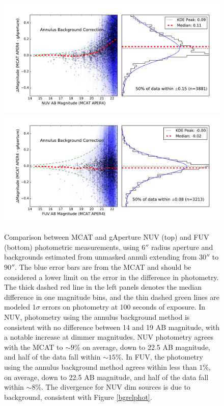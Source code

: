 \documentclass[iop]{emulateapj}
\begin{document}
\begin{figure}[t!]
\includegraphics[scale=0.3]{Fig04a.pdf}\\
\includegraphics[scale=0.3]{Fig04b.pdf}
\caption{Comparison between MCAT and gAperture NUV (top) and FUV (bottom) photometric measurements, using $6''$ radius aperture and backgrounds estimated from unmasked annuli extending from $30''$ to $90''$. The blue error bars are from the MCAT and should be considered a lower limit on the error in the difference in photometry. The thick dashed red line in the left panels denotes the median difference in one magnitude bins, and the thin dashed green lines are modeled 1$\sigma$ errors on photometry at 100 seconds of exposure. In NUV, photometry using the annulus background method is consistent with no difference between 14 and 19 AB magnitude, with a notable increase at dimmer magnitudes. NUV photometry agrees with the MCAT to $\sim 9$\% on average, down to 22.5 AB magnitude, and half of the data fall within $\sim 15$\%. In FUV, the photometry using the annulus background method agrees within less than $1$\%, on average, down to 22.5 AB magnitude, and half of the data fall within $\sim 8$\%. The divergence for NUV dim sources is due to background, consistent with Figure \ref{bgrelphot}.
\label{annulusrelphot}}
\end{figure}
\end{document}
